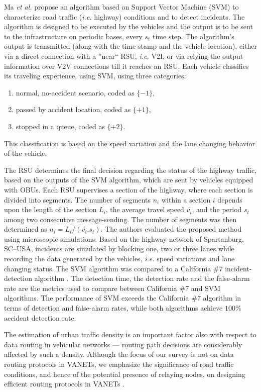 \documentclass[10pt,onecolumn]{article}
\begin{document}
Ma \textit{et al.} \cite{Ma2009} propose an algorithm based on Support Vector Machine (SVM) to characterize road traffic (\textit{i.e.} highway) conditions and to detect incidents. The algorithm is designed to be executed by the vehicles and the output is to be sent to the infrastructure on periodic bases, every $s_t$ time step. 
The algorithm's output is transmitted (along with the time stamp and the vehicle location), either via a direct connection with a ''near`` RSU, \textit{i.e.} V2I, or via relying the output information over V2V connections till it reaches an RSU. 
Each vehicle classifies its traveling experience, using SVM, using three categories:
\begin{enumerate}
 \item normal, no-accident scenario, coded as $\{-1\}$,
 \item passed by accident location, coded as $\{+1\}$,
 \item stopped in a queue, coded as $\{+2\}$.
\end{enumerate}
This classification is based on the speed variation and the lane changing behavior of the vehicle.

The RSU determines the final decision regarding the status of the highway traffic, based on the outputs of the SVM algorithm, which are sent by vehicles equipped with OBUs.
Each RSU supervises a section of the highway, where each section is divided into segments. The number of segments $n_i$ within
a section $i$ depends upon the length of the section $L_i$, the average travel speed $\bar{v_i}$, and the period $s_t$ among two 
consecutive message-sending. The number of segments was then determined as $n_i = L_i/(\bar{v_i}.s_t)$.
The authors evaluated the proposed method using microscopic simulations. 
Based on the highway network of Spartanburg, SC--USA, incidents are simulated by blocking one, two or three lanes while recording the data generated by the vehicles, \textit{i.e.} speed variations and lane changing status.
The SVM algorithm was compared to a California \#7 incident-detection algorithm \cite{cali7}. 
The detection time, the detection rate and the false-alarm rate are the metrics used to compare between California \#7 and SVM algorithms. 
The performance of SVM exceeds the California \#7 algorithm in terms of detection and false-alarm rates, while both algorithms achieve $100$\% accident detection rate.

The estimation of urban traffic density is an important factor also with respect to data routing in vehicular networks --- routing path decisions are considerably affected by such a density. Although the focus of our survey is not on data routing protocols in VANETs, we emphasize the significance of road traffic conditions, and hence of the potential presence of relaying nodes, on designing efficient routing protocols in VANETs \cite{Rondinone2010}. 
\end{document}
